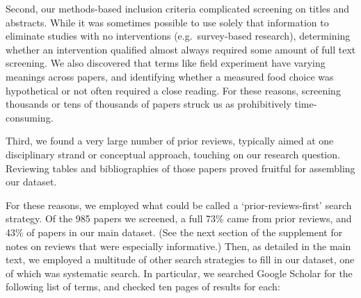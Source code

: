 \documentclass[sn-nature,referee,lineno,pdflatex]{sn-jnl}
\begin{document}
Second, our methods-based inclusion criteria complicated screening on
titles and abstracts. While it was sometimes possible to use solely that
information to eliminate studies with no interventions
(e.g.~survey-based research), determining whether an intervention
qualified almost always required some amount of full text screening. We
also discovered that terms like field experiment have varying meanings
across papers, and identifying whether a measured food choice was
hypothetical or not often required a close reading. For these reasons,
screening thousands or tens of thousands of papers struck us as
prohibitively time-consuming.

Third, we found a very large number of prior reviews, typically aimed at
one disciplinary strand or conceptual approach, touching on our research
question. Reviewing tables and bibliographies of those papers proved
fruitful for assembling our dataset.

For these reasons, we employed what could be called a
`prior-reviews-first' search strategy. Of the 985 papers we screened, a
full 73\% came from prior reviews, and 43\% of papers in our main
dataset. (See the next section of the supplement for notes on reviews
that were especially informative.) Then, as detailed in the main text,
we employed a multitude of other search strategies to fill in our
dataset, one of which was systematic search. In particular, we searched
Google Scholar for the following list of terms, and checked ten pages of
results for each:
\end{document}
